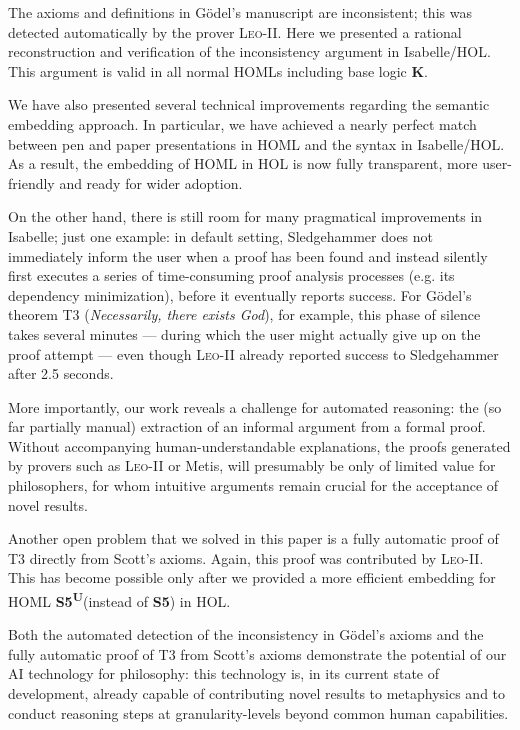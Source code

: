 \documentclass{llncs}
\newcommand{\logic}[1]{\textbf{#1}\xspace}
\newcommand{\K}{\logic{K}}
\newcommand{\SFive}{\logic{S5}}
\newcommand{\SFiveU}{\logic{S5\textsuperscript{U}}}
\begin{document}
The axioms and definitions in G\"odel's manuscript are inconsistent;
this was detected automatically by the prover
\textsc{Leo-II}. Here we presented a rational reconstruction and
verification of the inconsistency argument in Isabelle/HOL. This
argument is valid in all normal HOMLs including base logic \K.

We have also presented several technical improvements regarding the
semantic embedding approach. In particular, we have achieved a
nearly perfect match between pen and paper presentations in HOML and
the syntax in Isabelle/HOL. As a result, the embedding of HOML in HOL
is now fully transparent, more user-friendly and ready for wider adoption.

On the other hand, there is still room for many pragmatical
improvements in Isabelle; just one example: in default setting,
Sledgehammer does not immediately inform the user when a proof has
been found and instead silently first executes a series of
time-consuming proof analysis processes (e.g. its dependency
minimization), before it eventually reports success. For G\"odel's
theorem T3 (\textit{Necessarily, there exists God}), for example, this
phase of silence takes several minutes --- during which the user might
actually give up on the proof attempt --- even though \textsc{Leo-II} already
reported success to Sledgehammer after 2.5 seconds.

More importantly, our work reveals a challenge for automated reasoning:
the (so far partially manual) extraction of an informal argument from a formal proof. 
Without accompanying human-understandable explanations,
the proofs generated by provers such as \textsc{Leo-II} or Metis, will
presumably be only of limited value for philosophers, for whom intuitive
arguments remain crucial for the acceptance of novel results.

Another open problem that we solved in this paper is a fully automatic
proof of T3 directly from Scott's axioms. Again, this proof was
contributed by \textsc{Leo-II}. This has become possible only
after we provided a more efficient embedding for HOML \SFiveU (instead of \SFive) in HOL.


Both the automated detection of the inconsistency in G\"odel's axioms
and the fully automatic proof of T3 from Scott's axioms demonstrate
the potential of our AI technology for philosophy: this technology is,
in its current state of development, already capable of contributing novel results to
metaphysics and to conduct reasoning steps at granularity-levels
beyond common human capabilities.  
\vfill
\end{document}
